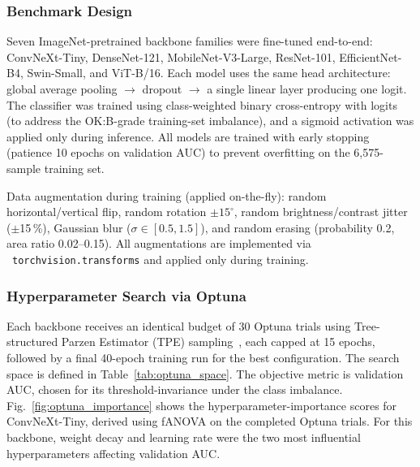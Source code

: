 \documentclass[conference]{IEEEtran}
\begin{document}
\subsubsection{Benchmark Design}
Seven ImageNet-pretrained backbone families were fine-tuned end-to-end: ConvNeXt-Tiny, DenseNet-121, MobileNet-V3-Large, ResNet-101, EfficientNet-B4, Swin-Small, and ViT-B/16. Each model uses the same head architecture: global average pooling $\to$ dropout $\to$ a single linear layer producing one logit. The classifier was trained using class-weighted binary cross-entropy with logits (to address the OK:B-grade training-set imbalance), and a sigmoid activation was applied only during inference. All models are trained with early stopping (patience 10 epochs on validation AUC) to prevent overfitting on the 6{,}575-sample training set.

Data augmentation during training (applied on-the-fly): random horizontal/vertical flip, random rotation $\pm15^\circ$, random brightness/contrast jitter ($\pm$15\,\%), Gaussian blur ($\sigma \in [0.5, 1.5]$), and random erasing (probability 0.2, area ratio 0.02--0.15). All augmentations are implemented via \ \texttt{torchvision.transforms} and applied only during training.

\subsubsection{Hyperparameter Search via Optuna}
Each backbone receives an identical budget of 30 Optuna trials using Tree-structured Parzen Estimator (TPE) sampling~\cite{akiba2019}, each capped at 15 epochs, followed by a final 40-epoch training run for the best configuration. The search space is defined in Table~\ref{tab:optuna_space}. The objective metric is validation AUC, chosen for its threshold-invariance under the class imbalance. Fig.~\ref{fig:optuna_importance} shows the hyperparameter-importance scores for ConvNeXt-Tiny, derived using fANOVA on the completed Optuna trials. For this backbone, weight decay and learning rate were the two most influential hyperparameters affecting validation AUC.
\end{document}
